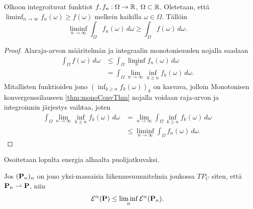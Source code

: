 \documentclass[12pt,oneside,a4paper]{amsbook} %
\begin{document}
\begin{lemma}\label{le:intRFctLSC} 
    Olkoon integroituvat funktiot $f, f_n : \Omega \to \R$, $\Omega \subset \R$. Oletetaan, että $\displaystyle \liminf_{n\to\infty} f_n(\omega) \ge f(\omega)$ melkein kaikilla $\omega \in \Omega$. Tällöin
        \begin{equation*}
            \liminf_{n\to \infty} \int_\Omega f_n(\omega) \, d\omega \ge \int_\Omega f(\omega)\, d\omega.
        \end{equation*}
\end{lemma}
\begin{proof}
Alaraja-arvon määritelmän ja integraalin monotonisuuden nojalla saadaan
    \begin{align*}
        \int_\Omega f(\omega) \, d\omega &\le \int_\Omega \liminf_n f_n(\omega) \, d\omega \\
        & = \int_\Omega \lim_{n\to\infty} \inf_{k\ge n} f_k(\omega) \, d\omega.
    \end{align*}
 Mitallisten funktioiden jono $(\inf_{k\ge n}f_k(\omega))_k$ on kasvava, jolloin Monotonisen konvergenssilauseen \ref{thm:monoConvThm} nojalla voidaan raja-arvon ja integroinnin järjestys vaihtaa, joten
    \begin{align*}
         \int_\Omega \lim_{n\to\infty} \inf_{k\ge n} f_k(\omega) \, d\omega &= \lim_{n\to\infty} \int_\Omega \inf_{k\ge n} f_k(\omega) \, d\omega \\
        &\le  \liminf_{n\to\infty} \int_\Omega f_n(\omega) \, d\omega. 
    \end{align*}
\end{proof}

Osoitetaan lopulta energia alhaalta puolijatkuvaksi.

\begin{theorem}\label{thm:energyLSC}
    Jos $(\P_n)_n$ on jono yksi-massaisia liikennesuunnitelmia joukossa $TP_C$ siten, että $\P_n \rightharpoonup \P$, niin
        \begin{equation*}
            \E^\alpha(\P) \le \liminf_n \E^\alpha(\P_n).
        \end{equation*}
\end{theorem}
\end{document}

